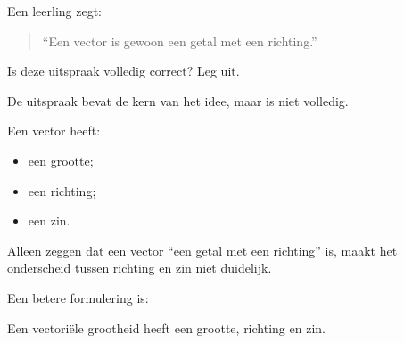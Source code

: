 \documentclass{ximera}
\begin{document}
\begin{oefening}{\oefU}

Een leerling zegt:

\begin{quote}
``Een vector is gewoon een getal met een richting.''
\end{quote}

\begin{question}
Is deze uitspraak volledig correct? Leg uit.

\begin{oplossing}
De uitspraak bevat de kern van het idee, maar is niet volledig.

Een vector heeft:

\begin{itemize}
    \item een grootte;
    \item een richting;
    \item een zin.
\end{itemize}

Alleen zeggen dat een vector ``een getal met een richting'' is, maakt het
onderscheid tussen richting en zin niet duidelijk.

Een betere formulering is:

\begin{center}
Een vectoriële grootheid heeft een grootte, richting en zin.
\end{center}
\end{oplossing}
\end{question}

\end{oefening}
\end{document}
